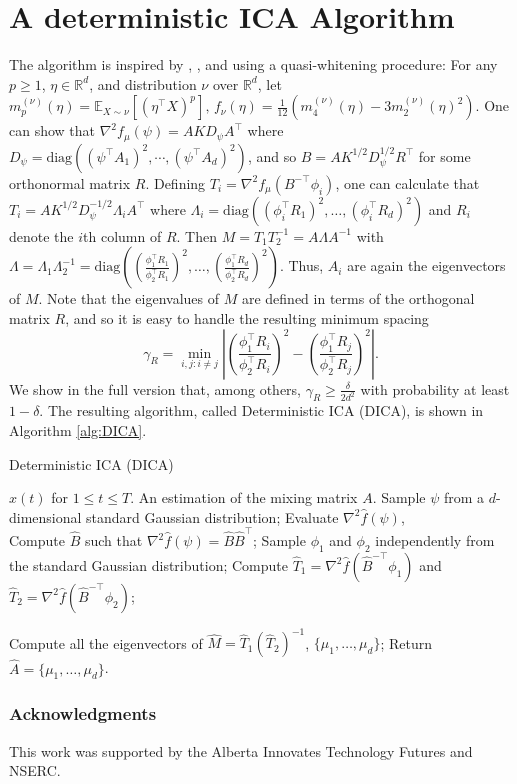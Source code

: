 \documentclass{article} %
\newcommand{\real}{\mathbb{R}}
\newcommand{\E}{\mathbb{E}}
\theoremstyle{definition}
\begin{document}
\section{A deterministic ICA Algorithm}
\label{sec:DICA}
The algorithm is inspired by \citet{hsu2013learning}, \citet{arora2012provable}, and \citet{frieze1996learning} using a quasi-whitening procedure:
For any $p\ge 1$, $\eta\in \real^d$, and distribution $\nu$ over $\real^d$,
let 
$m_p^{(\nu)}(\eta) = \E_{X\sim \nu}[ (\eta^\top X)^p ],\, f_{\nu}(\eta) = \tfrac1{12} \left( m_4^{(\nu)}(\eta) - 3 m_2^{(\nu)}(\eta)^2 \right)$.
One can show that $\nabla^2 f_\mu(\psi)=A K D_{\psi} A^\top$ where $D_{\psi} =\text{diag}\left((\psi^{\top}A_1)^2,\cdots, (\psi^{\top}A_d)^2\right)$,
and so $B= AK^{1/2}D_{\psi}^{1/2}R^{\top}$ for some orthonormal matrix $R$. Defining $T_i=\nabla^2 f_\mu(B^{-\top} \phi_i)$, one can calculate that
$T_i=A K^{1/2} D_\psi^{-1/2} \Lambda_i A^\top$ where $\Lambda_i =\text{diag}\left( (\phi_i^\top R_1)^2,\ldots,(\phi_i^\top R_d)^2 \right)$ and $R_i$ denote the $i$th column of $R$.
Then $M=T_1 T_2^{-1} = A\Lambda A^{-1}$ with $\Lambda=\Lambda_1 \Lambda_2^{-1}=\text{diag}\left( \left(\frac{\phi_1^\top R_1}{\phi_2^\top R_1}\right)^2,\ldots,\left(\frac{\phi_1^\top R_d}{\phi_2^\top R_d}\right)^2 \right)$. Thus, $A_i$ are again the eigenvectors of $M$.
Note that the eigenvalues of $M$ are defined in terms of the orthogonal matrix $R$,
and so it is easy to handle the resulting minimum spacing
\vspace{-3mm}
\begin{equation}
\label{def:gammaR}
\gamma_R =  \min_{i,j: i\neq j} \left\vert \left(\frac{\phi_1^{\top}R_i}{\phi_2^{\top}R_i}\right)^2 - \left(\frac{\phi_1^{\top}R_j}{\phi_2^{\top}R_j}\right)^2 \right\vert.
\end{equation}
We show in the full version \citep{HuGySz15} %
that, among others,  $\gamma_R \ge\frac{\delta}{2d^2}$ with probability at least $1-\delta$.
The resulting algorithm, called Deterministic ICA (DICA), is shown in Algorithm \ref{alg:DICA}. 
\begin{algorithm}
\caption{Deterministic ICA (DICA)}
\label{alg:DICA}
\begin{algorithmic}[1]
\INPUT $x(t)$ for $1\le t \le T$. 
\OUTPUT An estimation of the mixing matrix $A$. 
\STATE Sample $\psi$ from a $d$-dimensional standard Gaussian distribution;
\STATE Evaluate $\nabla^2\hat{f}(\psi)$, \\
\STATE Compute $\hat{B}$ such that $\nabla^2\hat{f}(\psi) = \hat{B}\hat{B}^{\top}$;
\STATE Sample $\phi_1$ and $\phi_2$ independently from the standard Gaussian distribution;
\STATE Compute $\hat{T}_1 =\nabla^2\hat{f}(\hat{B}^{-\top}\phi_1)$ and  $\hat{T}_2 =\nabla^2\hat{f}(\hat{B}^{-\top}\phi_2)$;

\STATE Compute all the eigenvectors of $\hat{M} = \hat{T}_1\left(\hat{T}_2\right)^{-1}$, $\{\mu_1,\ldots,\mu_d\}$;
\STATE Return $\hat{A} = \{\mu_1,\ldots,\mu_d\}$.
\end{algorithmic}
\end{algorithm}

\subsubsection*{Acknowledgments}
This work was supported by the Alberta Innovates Technology Futures and NSERC.


\end{document}
